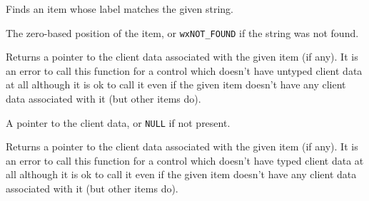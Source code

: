 



\label{wxcontrolwithitemsfindstring}


Finds an item whose label matches the given string.





The zero-based position of the item, or {\tt wxNOT\_FOUND} if the string was
not found.


\label{wxcontrolwithitemsgetclientdata}


Returns a pointer to the client data associated with the given item (if any).
It is an error to call this function for a control which doesn't have untyped
client data at all although it is ok to call it even if the given item doesn't
have any client data associated with it (but other items do).




A pointer to the client data, or {\tt NULL} if not present.


\label{wxcontrolwithitemsgetclientobject}


Returns a pointer to the client data associated with the given item (if any).
It is an error to call this function for a control which doesn't have typed
client data at all although it is ok to call it even if the given item doesn't
have any client data associated with it (but other items do).


